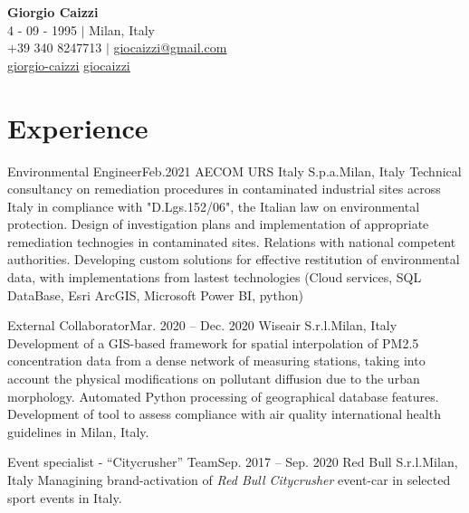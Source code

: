 \documentclass[letterpaper,11pt]{article}
\begin{document}
\begin{center}
  \textbf{\Huge \bfseries Giorgio Caizzi} \\
  \vspace{2pt} 4 - 09 - 1995 $|$ Milan, Italy \\
  \small +39 340 8247713 $|$ \href{mailto:x@x.com}{\underline{giocaizzi@gmail.com}}\\
  \faLinkedinSquare{ : }\href{https://linkedin.com/in/giorgio-caizzi/}{\underline{giorgio-caizzi}}
  \faGithubSquare{ : }\href{https://www.github.com/giocaizzi/}{\underline{giocaizzi}}\\
\end{center}

\section{Experience}
\subHeadingListStart

\subHeading
{Environmental Engineer}{Feb.2021}
{AECOM URS Italy S.p.a.}{Milan, Italy}
{Technical consultancy on remediation procedures in contaminated industrial sites across Italy
  in compliance with "D.Lgs.152/06", the Italian law on environmental protection.}
\subHeadingItemListStart
\subHeadingItem
{Design of investigation plans and implementation of appropriate
  remediation technogies in contaminated sites.}
\subHeadingItem
{Relations with national competent authorities.}
\subHeadingItem
{Developing custom solutions for effective restitution of environmental data,
  with implementations from lastest technologies (Cloud services, SQL DataBase,
  Esri ArcGIS, Microsoft Power BI, python)}
\subHeadingItemListEnd

\subHeading
{External Collaborator}{Mar. 2020 -- Dec. 2020}
{Wiseair S.r.l.}{Milan, Italy}
{Development of a GIS-based framework for spatial interpolation of PM2.5 concentration
  data from a dense network of measuring stations, taking into account the physical
  modifications on pollutant diffusion due to the urban morphology.}
\subHeadingItemListStart
\subHeadingItem
{Automated Python processing of geographical database features.}
\subHeadingItem
{Development of tool to assess compliance with air quality international health guidelines
  in Milan, Italy.}
\subHeadingItemListEnd

\subHeading
{Event specialist - “Citycrusher” Team}{Sep. 2017 -- Sep. 2020}
{Red Bull S.r.l.}{Milan, Italy}
{Managining brand-activation of \textit{Red Bull Citycrusher} event-car in selected sport
  events in Italy.}
\end{document}
